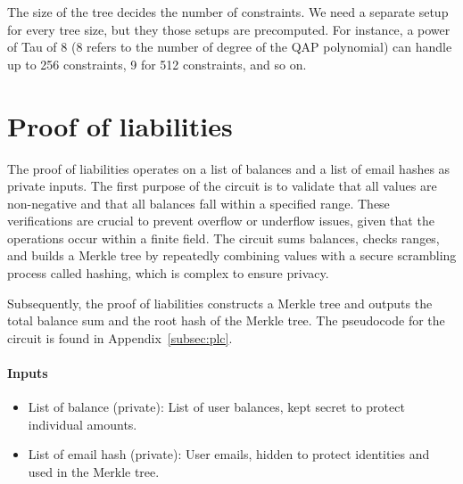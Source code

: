 The size of the tree decides the number of constraints. We need a separate setup for every tree size, but they those setups are precomputed. 
For instance, a power of Tau of 8 (8 refers to the number of degree of the QAP polynomial) can handle up to 256 constraints, 9 for 512 constraints, and so on.


\section{Proof of liabilities}
\label{subsec:pl}
The proof of liabilities operates on a list of balances and a list of email hashes as private inputs. %
The first purpose of the circuit is to validate that all values are non-negative and that all balances fall within a specified range.
These verifications are crucial to prevent overflow or underflow issues, given that the operations occur within a finite field. %
The circuit sums balances, checks ranges, and builds a Merkle tree by repeatedly combining values with a secure scrambling process called hashing, which is complex to ensure privacy.

Subsequently, the proof of liabilities constructs a Merkle tree and outputs the total balance sum and the root hash of the Merkle tree.
The pseudocode for the circuit is found in Appendix~\ref{subsec:plc}.


\paragraph{Inputs}
\begin{itemize}
   \item List of balance (private): List of user balances, kept secret to protect individual amounts.
   \item List of email hash (private): User emails, hidden to protect identities and used in the Merkle tree. %
   \end{itemize}

